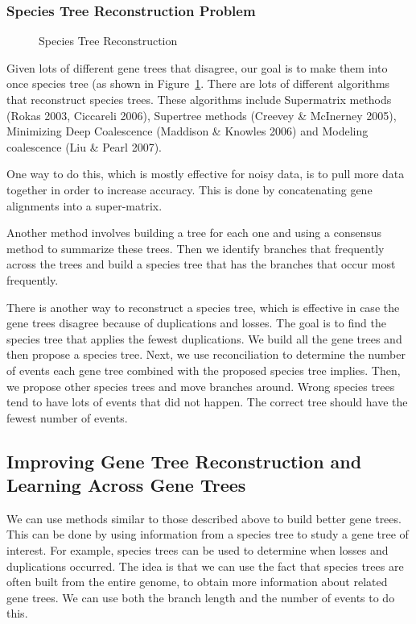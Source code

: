 \subsubsection{Species Tree Reconstruction Problem}

\begin{figure}[H]
  \centering
  \caption{Species Tree Reconstruction} 
  \label{SpeciesTreeReconstruction}
\end{figure}

Given lots of different gene trees that disagree, our goal is to make them into once species tree (as shown in Figure~\ref{SpeciesTreeReconstruction}. There are lots of different algorithms that reconstruct species trees. These algorithms include Supermatrix methods (Rokas 2003, Ciccareli 2006), Supertree methods (Creevey \& McInerney 2005), Minimizing Deep Coalescence (Maddison \& Knowles 2006) and  Modeling coalescence (Liu \& Pearl 2007). 

One way to do this, which is mostly effective for noisy data, is to
pull more data together in order to increase accuracy. This is done by concatenating gene alignments into a super-matrix.

Another method involves building a tree for each one and using a consensus method to summarize these trees. Then we identify branches that frequently across the trees and build a species tree that has the branches that occur most frequently.

There is another way to reconstruct a species tree, which is effective in case the gene trees disagree because of duplications and losses. The goal is to find the species tree that applies the fewest duplications. We build all the gene trees and then propose a species tree. Next, we use reconciliation to determine the number of events each gene tree combined with the proposed species tree implies. Then, we propose other species trees and move branches around. Wrong species trees tend to have lots of events that did not happen. The correct tree should have the fewest number of events. 


\subsection{Improving Gene Tree Reconstruction and Learning Across Gene Trees}
We can use methods similar to those described above to build better gene trees. This can be done by using information from a species tree to study a gene tree of interest. For example, species trees can be used to determine when losses and duplications occurred. The idea is that we can use the fact that species trees are often built from the entire genome, to obtain more information about related gene trees. We can use both the branch length and the number of events to do this. 

